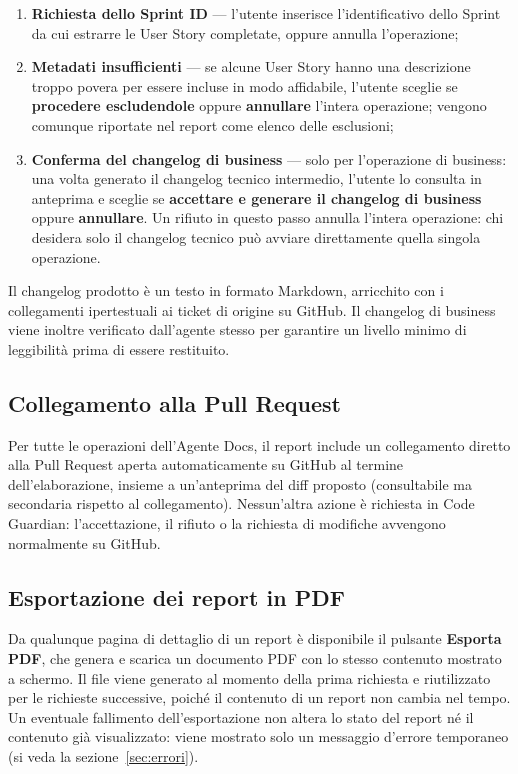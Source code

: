 \documentclass[11pt,a4paper]{article}
\begin{document}
\begin{enumerate}
  \item \textbf{Richiesta dello Sprint ID} --- l'utente inserisce l'identificativo dello
        Sprint da cui estrarre le User Story completate, oppure annulla l'operazione;
  \item \textbf{Metadati insufficienti} --- se alcune User Story hanno una descrizione
        troppo povera per essere incluse in modo affidabile, l'utente sceglie se
        \textbf{procedere escludendole} oppure \textbf{annullare} l'intera operazione;
        vengono comunque riportate nel report come elenco delle esclusioni;
  \item \textbf{Conferma del changelog di business} --- solo per l'operazione di business:
        una volta generato il changelog tecnico intermedio, l'utente lo consulta in
        anteprima e sceglie se \textbf{accettare e generare il changelog di business}
        oppure \textbf{annullare}. Un rifiuto in questo passo annulla l'intera operazione:
        chi desidera solo il changelog tecnico può avviare direttamente quella singola
        operazione.
\end{enumerate}

Il changelog prodotto è un testo in formato Markdown, arricchito con i collegamenti
ipertestuali ai ticket di origine su GitHub. Il changelog di business viene inoltre
verificato dall'agente stesso per garantire un livello minimo di leggibilità prima di essere
restituito.

\subsection{Collegamento alla Pull Request}

Per tutte le operazioni dell'Agente Docs, il report include un collegamento diretto alla
Pull Request aperta automaticamente su GitHub al termine dell'elaborazione, insieme a
un'anteprima del diff proposto (consultabile ma secondaria rispetto al collegamento).
Nessun'altra azione è richiesta in Code Guardian: l'accettazione, il rifiuto o la richiesta
di modifiche avvengono normalmente su GitHub.

\subsection{Esportazione dei report in PDF}

Da qualunque pagina di dettaglio di un report è disponibile il pulsante \textbf{Esporta
PDF}, che genera e scarica un documento PDF con lo stesso contenuto mostrato a schermo. Il
file viene generato al momento della prima richiesta e riutilizzato per le richieste
successive, poiché il contenuto di un report non cambia nel tempo. Un eventuale fallimento
dell'esportazione non altera lo stato del report né il contenuto già visualizzato: viene
mostrato solo un messaggio d'errore temporaneo (si veda la sezione~\ref{sec:errori}).
\end{document}
